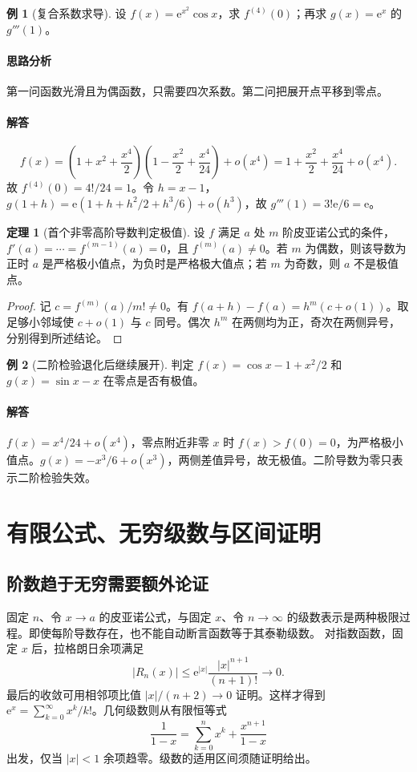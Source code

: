 \documentclass[UTF8,fontset=fandol,12pt,oneside,openany]{ctexrep}
\newcommand{\ee}{\mathrm e}
\theoremstyle{definition}
\newtheorem{theorem}{定理}[chapter]
\newtheorem{example}{例}[chapter]
\begin{document}
\begin{example}[复合系数求导]设 $f(x)=\ee^{x^2}\cos x$，求 $f^{(4)}(0)$；再求 $g(x)=\ee^x$ 的 $g'''(1)$。\end{example}
\paragraph{思路分析}第一问函数光滑且为偶函数，只需要四次系数。第二问把展开点平移到零点。
\paragraph{解答}
\[
f(x)=\left(1+x^2+\frac{x^4}2\right)
\left(1-\frac{x^2}2+\frac{x^4}{24}\right)+o(x^4)
=1+\frac{x^2}2+\frac{x^4}{24}+o(x^4).
\]
故 $f^{(4)}(0)=4!/24=1$。令 $h=x-1$，$g(1+h)=\ee(1+h+h^2/2+h^3/6)+o(h^3)$，故 $g'''(1)=3!\ee/6=\ee$。

\begin{theorem}[首个非零高阶导数判定极值]
设 $f$ 满足 $a$ 处 $m$ 阶皮亚诺公式的条件，$f'(a)=\cdots=f^{(m-1)}(a)=0$，且 $f^{(m)}(a)\ne0$。若 $m$ 为偶数，则该导数为正时 $a$ 是严格极小值点，为负时是严格极大值点；若 $m$ 为奇数，则 $a$ 不是极值点。
\end{theorem}
\begin{proof}记 $c=f^{(m)}(a)/m!\ne0$。有 $f(a+h)-f(a)=h^m(c+o(1))$。取足够小邻域使 $c+o(1)$ 与 $c$ 同号。偶次 $h^m$ 在两侧均为正，奇次在两侧异号，分别得到所述结论。\end{proof}
\begin{example}[二阶检验退化后继续展开]判定 $f(x)=\cos x-1+x^2/2$ 和 $g(x)=\sin x-x$ 在零点是否有极值。\end{example}
\paragraph{解答}$f(x)=x^4/24+o(x^4)$，零点附近非零 $x$ 时 $f(x)>f(0)=0$，为严格极小值点。$g(x)=-x^3/6+o(x^3)$，两侧差值异号，故无极值。二阶导数为零只表示二阶检验失效。

\section{有限公式、无穷级数与区间证明}
\label{lec:08:global}
\subsection{阶数趋于无穷需要额外论证}
固定 $n$、令 $x\to a$ 的皮亚诺公式，与固定 $x$、令 $n\to\infty$ 的级数表示是两种极限过程。即使每阶导数存在，也不能自动断言函数等于其泰勒级数。
对指数函数，固定 $x$ 后，拉格朗日余项满足
\[
|R_n(x)|\le\ee^{|x|}\frac{|x|^{n+1}}{(n+1)!}\longrightarrow0.
\]
最后的收敛可用相邻项比值 $|x|/(n+2)\to0$ 证明。这样才得到 $\ee^x=\sum_{k=0}^\infty x^k/k!$。几何级数则从有限恒等式
\[
\frac1{1-x}=\sum_{k=0}^nx^k+\frac{x^{n+1}}{1-x}
\]
出发，仅当 $|x|<1$ 余项趋零。级数的适用区间须随证明给出。
\end{document}
